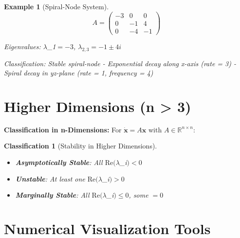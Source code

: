 \documentclass[12pt]{article}
\newtheorem{classification}{Classification}
\newtheorem{example}{Example}
\begin{document}
\begin{example}[Spiral-Node System]
$$A = \begin{pmatrix} -3 & 0 & 0 \\ 0 & -1 & 4 \\ 0 & -4 & -1 \end{pmatrix}$$

Eigenvalues: $\lambda$_{1}$ = -3$, $\lambda_{2,3} = -1 \pm 4i$

Classification: Stable spiral-node
- Exponential decay along x-axis (rate = 3)
- Spiral decay in yz-plane (rate = 1, frequency = 4)
\end{example}

\section{Higher Dimensions (n > 3)}

\begin{keypoint}
\textbf{Classification in n-Dimensions:}
For $\dot{\mathbf{x}} = A\mathbf{x}$ with $A \in \mathbb{R}^{n \times n}$:
\end{keypoint}

\begin{classification}[Stability in Higher Dimensions]
\begin{itemize}
    \item \textbf{Asymptotically Stable}: All $\text{Re}(\lambda$_{i}$) < 0$
    \item \textbf{Unstable}: At least one $\text{Re}(\lambda$_{i}$) > 0$
    \item \textbf{Marginally Stable}: All $\text{Re}(\lambda$_{i}$) \leq 0$, some $= 0$
\end{itemize}
\end{classification}

\section{Numerical Visualization Tools}
\end{document}
